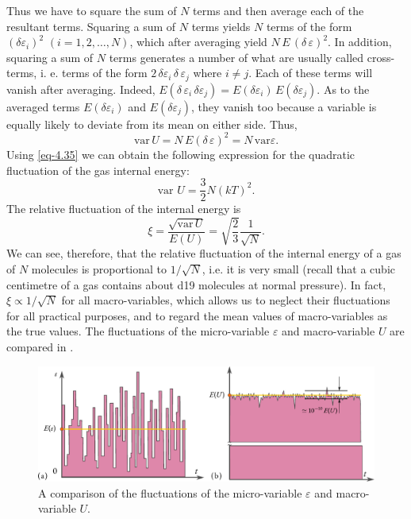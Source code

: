 Thus we have to square the sum of $N$ terms and then average each of the resultant terms. Squaring a sum of $N$ terms yields $N$ terms of the form $(\delta \varepsilon_{i})^{2} \,\, (i = 1, 2,\ldots, N)$, which after averaging yield $N\,E\,(\delta \,\varepsilon)^{2}$. In addition, squaring a sum of $N$ terms generates a number of what are usually called cross-terms, i. e. terms of the form $2 \, \delta \varepsilon_{i}  \, \delta \, \varepsilon_{j} $ where $i \neq j$. Each of these terms will vanish after averaging. Indeed,	$E (\delta \,\varepsilon_{i}  \, \delta  \varepsilon_{j}) = E(\delta \varepsilon_{i})  \, E(\delta  \varepsilon_{j})$. As to the averaged terms $ E(\delta \varepsilon_{i}) $ and $ E(\delta \varepsilon_{j}) $, they vanish too because a variable is equally likely to deviate from its mean on
either side. Thus, 
\begin{equation}%
\textrm{var} \, U =  N \, E ( \delta \, \varepsilon)^{2} = N \, \textrm{var} \varepsilon.
\label{eq-4.41}
\end{equation}
Using \eqref{eq-4.35} we can obtain the following expression for the quadratic fluctuation of the gas internal energy:
\begin{equation}%
\text{var} \,\, U= \frac{3}{2} N(kT)^{2}.
\label{eq-4.42}
\end{equation}
The relative fluctuation of the internal energy is
\begin{equation}%
\xi = \frac{\sqrt{\text{var} \, U}}{E(U)} = \sqrt{\frac{2}{3}} \frac{1}{\sqrt{N}}.
\label{eq-4.43}
\end{equation}
We can see, therefore, that the relative fluctuation of the internal energy of a gas of $N$ molecules is proportional to $1 /\sqrt{N}$, i.e. it is very small (recall that a cubic centimetre of a gas contains about \num{d19} molecules at normal pressure). In fact, $\xi \propto  1 / \sqrt{N}$ for all macro-variables, which allows us to neglect their fluctuations for all practical purposes, and to regard the mean values of macro-variables as the true values. The fluctuations of the micro-variable	$\varepsilon$ and	macro-variable $U$ are compared	 in .

\begin{figure}%
\includegraphics[width=1.4\textwidth]{figures/macro-micro.pdf}
\caption{A comparison of the fluctuations of the micro-variable	$\varepsilon$ and	macro-variable $U$.\label{macro-micro}}
\end{figure}

